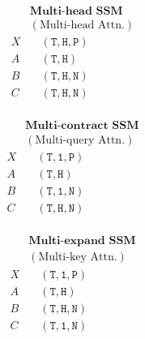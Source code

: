 \documentclass{article}
\begin{document}
\begin{minipage}[t]{.25\linewidth}
  \begin{equation}
    \label{eq:multihead}
    \begin{aligned}
        & \textbf{Multi-head SSM} \\
        & (\textrm{Multi-head Attn.}) \\
      X & \quad \mathtt{(T, H, P)} \\
      A & \quad \mathtt{(T, H)} \\
      B & \quad \mathtt{(T, H, N)} \\
      C & \quad \mathtt{(T, H, N)} \\
    \end{aligned}
  \end{equation}
\end{minipage}
\begin{minipage}[t]{.25\linewidth}
  \begin{equation}
    \label{eq:multiquery}
    \begin{aligned}
    & \textbf{Multi-contract SSM} \\
    & (\textrm{Multi-query Attn.}) \\
      X & \quad \mathtt{(T, 1, P)} \\
      A & \quad \mathtt{(T, H)} \\
      B & \quad \mathtt{(T, 1, N)} \\
      C & \quad \mathtt{(T, H, N)} \\
    \end{aligned}
  \end{equation}
\end{minipage}
\begin{minipage}[t]{.25\linewidth}
  \begin{equation}
    \label{eq:multikey}
    \begin{aligned}
    & \textbf{Multi-expand SSM} \\
    & (\textrm{Multi-key Attn.}) \\
      X & \quad \mathtt{(T, 1, P)} \\
      A & \quad \mathtt{(T, H)} \\
      B & \quad \mathtt{(T, H, N)} \\
      C & \quad \mathtt{(T, 1, N)} \\
    \end{aligned}
  \end{equation}
\end{minipage}
\end{document}
